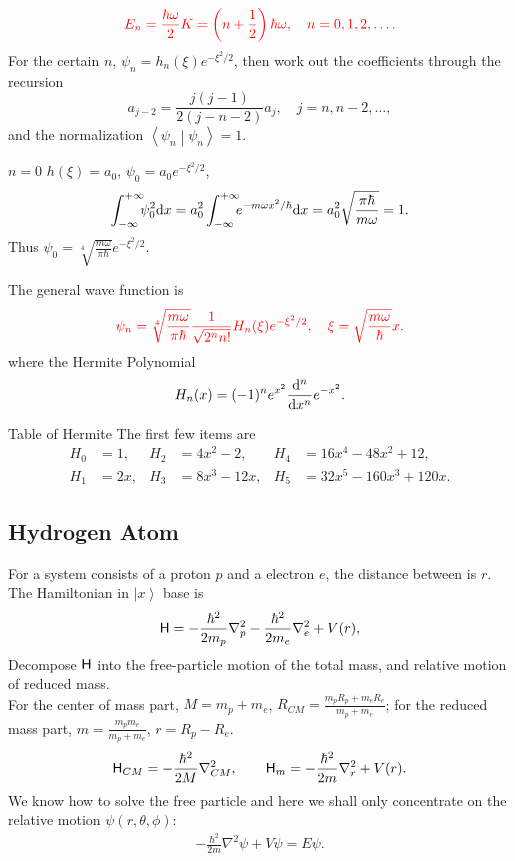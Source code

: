 \documentclass{article}
\def\d{{\rm d}}
\newcommand{\ko}[1]{\hspace{-#1 pt}}%
\newcommand{\ket}[1]{\left\vert #1\right\rangle}
\newcommand{\brkt}[2]{\left\langle #1\middle\vert#2\right\rangle}
\newcommand{\spark}[1]{\textcolor{red}{#1}}
\begin{document}
$$\spark{E_n=\frac{\hbar\omega}2K=\left(n+\frac12\right)\hbar\omega,\quad n=0,1,2,\ldots.}$$
For the certain $n$, $\psi_n=h_n(\xi)e^{-\xi^2/2}$, then work out the coefficients through the recursion
$$a_{j-2}=\frac{j(j-1)}{2(j-n-2)}a_j,\quad j=n,n-2,\ldots,$$
and the normalization $\brkt{\psi_n}{\psi_n}=1$.
\begin{example}{$n=0$}{}
	$h(\xi)=a_0$, $\psi_0=a_0e^{-\xi^2/2}$,
	$$\int_{-\infty}^{+\infty}\ko5\psi_0^2\d x=a_0^2\int_{-\infty}^{+\infty}\ko5e^{-m\omega x^2/\hbar}\d x=a_0^2\sqrt{\frac{\pi\hbar}{m\omega}}=1.$$
	Thus
	$\psi_0=\sqrt[4]{\frac{m\omega}{\pi\hbar}}e^{-\xi^2/2}.$
\end{example}
The general wave function is
$$\spark{\psi_n=\sqrt[4]{\frac{m\omega}{\pi\hbar}}\frac1{\sqrt{2^nn!}}H_n(\xi)e^{-\xi^2/2},\quad\xi=\sqrt{\frac{m\omega}\hbar}x.}$$
where the Hermite Polynomial 
$$H_n(x)=(-1)^ne^{x^2}\frac{\d^n}{\d x^n}e^{-x^2}.$$
\begin{example}{Table of Hermite}{}
	The first few items are %
	\begin{align*}
		H_0 & =1,  & H_2 & =4x^2-2,   & H_4 & =16x^4-48x^2+12,    \\
		H_1 & =2x, & H_3 & =8x^3-12x, & H_5 & =32x^5-160x^3+120x.
	\end{align*}
	\iffalse
		\begin{align*}
			\psi_0 & \propto e^{-\xi^2/2}            & \psi_3 & \propto\frac1{\sqrt3}(2\xi^3-3\xi),
			\psi_1 & \propto\sqrt2\xi e^{-\xi^2/2}   & \psi_4 & \propto\frac1{2\sqrt6}(4\xi^4-12\xi^3+3),     \\
			\psi_2 & \propto\frac1{\sqrt2}(2\xi^2-1) & \psi_6 & \propto\frac1{2\sqrt{30}}(4\xi^5-20\xi^3+15).
		\end{align*}
	\fi
\end{example}
\clearpage
\subsection{Hydrogen Atom}
For a system consists of a proton $p$ and a electron $e$, the distance between is $r$. The Hamiltonian in $\ket x$ base is
$$\mathsf H=-\frac{\hbar^2}{2m_p}\nabla^2_p-\frac{\hbar^2}{2m_e}\nabla^2_e+V(r),$$
Decompose $\mathsf H$ into the free-particle motion of the total mass, and relative motion of reduced mass.\\
For the center of mass part, $M=m_p+m_e$, $R_{CM}=\frac{m_pR_p+m_eR_e}{m_p+m_e}$; for the reduced mass part, $m=\frac{m_pm_e}{m_p+m_e}$, $r=R_p-R_e$.
$$\mathsf H_{CM}=-\frac{\hbar^2}{2M}\nabla_{CM}^2,\qquad\mathsf H_m=-\frac{\hbar^2}{2m}\nabla_r^2+V(r).$$
We know how to solve the free particle and here we shall only concentrate on the relative motion $\psi(r,\theta,\phi)$:
\begin{align}\label{s-eqn}
	-\frac{\hbar^2}{2m}\nabla^2\psi+V\psi=E\psi.
\end{align}
\end{document}

